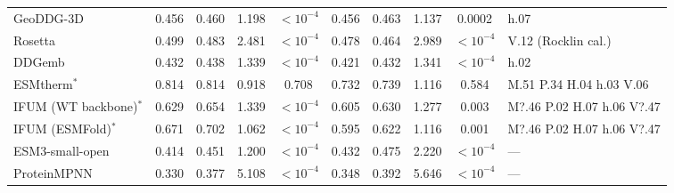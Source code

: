 \begin{table}[H]
{\begin{tabular}{lccccccccl}
GeoDDG-3D & 0.456 & 0.460 & 1.198 & $<10^{-4}$ & 0.456 & 0.463 & 1.137 & 0.0002 & h.07 \\
Rosetta & 0.499 & 0.483 & 2.481 & $<10^{-4}$ & 0.478 & 0.464 & 2.989 & $<10^{-4}$ & V.12 (Rocklin cal.) \\
DDGemb & 0.432 & 0.438 & 1.339 & $<10^{-4}$ & 0.421 & 0.432 & 1.341 & $<10^{-4}$ & h.02 \\
ESMtherm$^*$ & 0.814 & 0.814 & 0.918 & 0.708 & 0.732 & 0.739 & 1.116 & 0.584 & M.51 P.34 H.04 h.03 V.06 \\
IFUM (WT backbone)$^*$ & 0.629 & 0.654 & 1.339 & $<10^{-4}$ & 0.605 & 0.630 & 1.277 & 0.003 & M?.46 P.02 H.07 h.06 V?.47 \\
IFUM (ESMFold)$^*$ & 0.671 & 0.702 & 1.062 & $<10^{-4}$ & 0.595 & 0.622 & 1.116 & 0.001 & M?.46 P.02 H.07 h.06 V?.47 \\
ESM3-small-open & 0.414 & 0.451 & 1.200 & $<10^{-4}$ & 0.432 & 0.475 & 2.220 & $<10^{-4}$ & --- \\
ProteinMPNN & 0.330 & 0.377 & 5.108 & $<10^{-4}$ & 0.348 & 0.392 & 5.646 & $<10^{-4}$ & --- \\
\bottomrule
\end{tabular}
}
\end{table}




